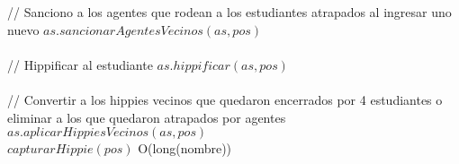 {    %
    \State // Sanciono a los agentes que rodean a los estudiantes atrapados al ingresar uno nuevo
    \State $as.sancionarAgentesVecinos(as,pos)$ 
    \\
    \\
    \State // Hippificar al estudiante
      \State $as.hippificar(as,pos)$ 
    \EndIf
    \\
    \\
    \State // Convertir a los hippies vecinos que quedaron encerrados por 4 estudiantes o eliminar a los que quedaron atrapados por agentes
    \State $as.aplicarHippiesVecinos(as,pos)$ 
    \\
        \State $capturarHippie(pos)$ 
    \EndIf
 }{O(long(nombre))}
 
 
 
